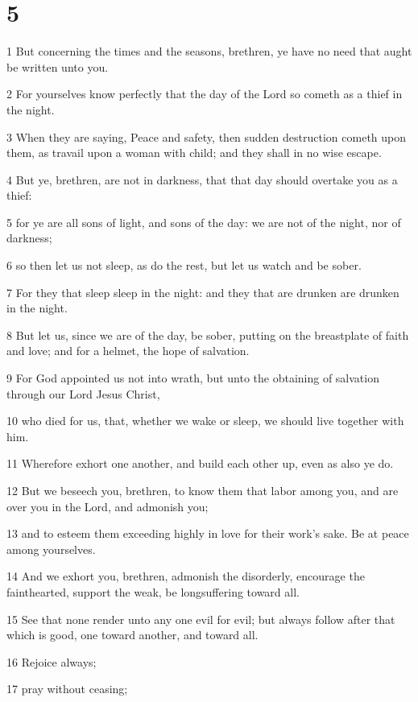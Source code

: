 \chapter{5}

\par 1 But concerning the times and the seasons, brethren, ye have no need that aught be written unto you.
\par 2 For yourselves know perfectly that the day of the Lord so cometh as a thief in the night.
\par 3 When they are saying, Peace and safety, then sudden destruction cometh upon them, as travail upon a woman with child; and they shall in no wise escape.
\par 4 But ye, brethren, are not in darkness, that that day should overtake you as a thief:
\par 5 for ye are all sons of light, and sons of the day: we are not of the night, nor of darkness;
\par 6 so then let us not sleep, as do the rest, but let us watch and be sober.
\par 7 For they that sleep sleep in the night: and they that are drunken are drunken in the night.
\par 8 But let us, since we are of the day, be sober, putting on the breastplate of faith and love; and for a helmet, the hope of salvation.
\par 9 For God appointed us not into wrath, but unto the obtaining of salvation through our Lord Jesus Christ,
\par 10 who died for us, that, whether we wake or sleep, we should live together with him.
\par 11 Wherefore exhort one another, and build each other up, even as also ye do.
\par 12 But we beseech you, brethren, to know them that labor among you, and are over you in the Lord, and admonish you;
\par 13 and to esteem them exceeding highly in love for their work's sake. Be at peace among yourselves.
\par 14 And we exhort you, brethren, admonish the disorderly, encourage the fainthearted, support the weak, be longsuffering toward all.
\par 15 See that none render unto any one evil for evil; but always follow after that which is good, one toward another, and toward all.
\par 16 Rejoice always;
\par 17 pray without ceasing;
